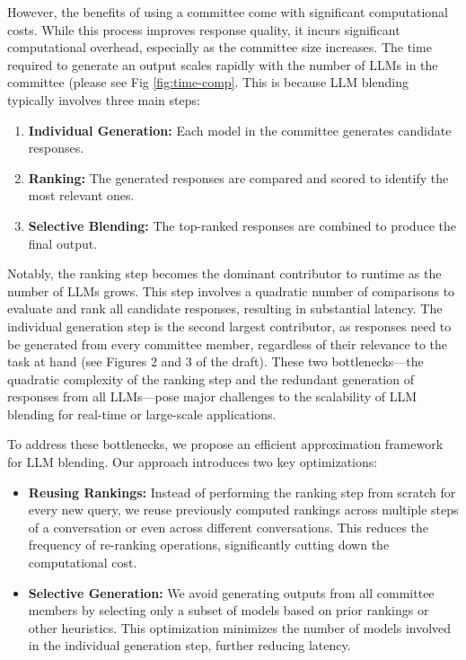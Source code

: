 \documentclass[sigconf,authordraft]{acmart}
\begin{document}
However, the benefits of using a committee come with significant computational costs. While this process improves response quality, it incurs significant computational overhead, especially as the committee size increases. The time required to generate an output scales rapidly with the number of LLMs in the committee (please see Fig \ref{fig:time-comp}. This is because LLM blending typically involves three main steps: 
\begin{enumerate}
    \item \textbf{Individual Generation:} Each model in the committee generates candidate responses. 
    \item \textbf{Ranking:} The generated responses are compared and scored to identify the most relevant ones. 
    \item \textbf{Selective Blending:} The top-ranked responses are combined to produce the final output.
\end{enumerate}


Notably, the ranking step becomes the dominant contributor to runtime as the number of LLMs grows. This step involves a quadratic number of comparisons to evaluate and rank all candidate responses, resulting in substantial latency. The individual generation step is the second largest contributor, as responses need to be generated from every committee member, regardless of their relevance to the task at hand (see Figures 2 and 3 of the draft). These two bottlenecks—the quadratic complexity of the ranking step and the redundant generation of responses from all LLMs—pose major challenges to the scalability of LLM blending for real-time or large-scale applications.

To address these bottlenecks, we propose an efficient approximation framework for LLM blending. Our approach introduces two key optimizations:
\begin{itemize}
    \item \textbf{Reusing Rankings:} Instead of performing the ranking step from scratch for every new query, we reuse previously computed rankings across multiple steps of a conversation or even across different conversations. This reduces the frequency of re-ranking operations, significantly cutting down the computational cost.
    \item \textbf{Selective Generation:} We avoid generating outputs from all committee members by selecting only a subset of models based on prior rankings or other heuristics. This optimization minimizes the number of models involved in the individual generation step, further reducing latency.
\end{itemize}
\end{document}
